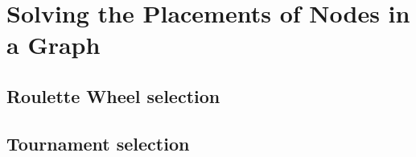 \section{Solving the Placements of Nodes in a Graph}

\subsection{Roulette Wheel selection}

\subsection{Tournament selection}
